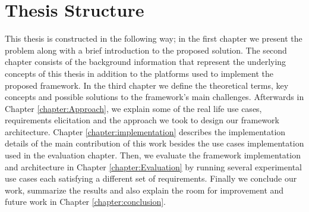  


\section{Thesis Structure}

This thesis is constructed in the following way; in the first chapter we present the problem along with a brief introduction to the proposed solution. The second chapter consists of the background information  that represent the underlying  concepts of this thesis in addition to the platforms used to implement the proposed framework. In the third chapter we define the theoretical terms, key concepts and possible solutions to the framework's main challenges. Afterwards in Chapter \ref{chapter:Approach}, we explain some of the real life use cases, requirements elicitation and the approach we took to design our framework architecture. Chapter \ref{chapter:implementation} describes the implementation details of the main contribution of this work besides the use cases implementation used in the evaluation chapter. Then, we evaluate the framework implementation and  architecture in Chapter \ref{chapter:Evaluation} by running several experimental use cases each satisfying a different set of requirements. Finally we conclude our work, summarize the results and also explain the room for improvement and future work in Chapter \ref{chapter:conclusion}.